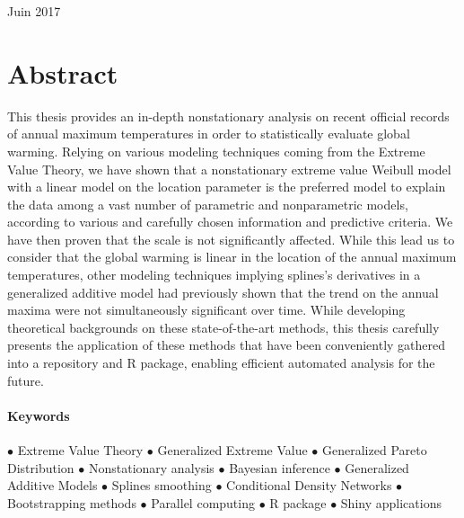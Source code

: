 \documentclass[11pt,a4paper,openany, twosided]{book}
\begin{document}
\vspace{1,5cm}



\begin{center}
	{\large Juin 2017}
\end{center}
\thispagestyle{empty}
\newpage


{}
\vspace*{\fill}
\section*{\centering Abstract}
\begin{tcolorbox}%
This thesis provides an in-depth nonstationary analysis on recent official records of annual maximum temperatures in order to statistically evaluate global warming. Relying on various modeling techniques coming from the Extreme Value Theory, we have shown that a nonstationary extreme value Weibull model with a linear model on the location parameter is the preferred model to explain the data among a vast number of parametric and nonparametric models, according to various and carefully chosen information and predictive criteria. We have then proven that the scale is not significantly affected. While this lead us to consider that the global warming is linear in the location of the annual maximum temperatures, other modeling techniques implying splines's derivatives in a generalized additive model had previously shown that the trend on the annual maxima were not simultaneously significant over time.
While developing theoretical backgrounds on these state-of-the-art methods, this thesis carefully presents the application of these methods that have been conveniently gathered into a repository and R package, enabling efficient automated analysis for the future.

\thispagestyle{empty}
\end{tcolorbox}

\vspace{.3cm}

\paragraph*{Keywords} $\bullet$ Extreme Value Theory   $\bullet$ Generalized Extreme Value  $\bullet$ Generalized Pareto Distribution $\bullet$ Nonstationary analysis $\bullet$ Bayesian inference   $\bullet$ Generalized Additive Models $\bullet$ Splines smoothing  $\bullet$ Conditional Density Networks $\bullet$ Bootstrapping methods $\bullet$ Parallel computing $\bullet$ R package $\bullet$ Shiny applications
\vspace*{\fill}
\end{document}
